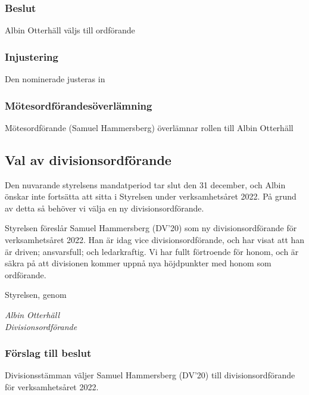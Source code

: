 \documentclass[protokoll]{dvd}
\begin{document}
        \subsubsection*{Beslut}
            \begin{attsatser}
                \item Albin Otterhäll väljs till ordförande
            \end{attsatser}

        \subsubsection*{Injustering}
        Den nominerade justeras in

        \subsubsection*{Mötesordförandesöverlämning}
        Mötesordförande (Samuel Hammersberg) överlämnar rollen till Albin Otterhäll

\newpage

\subsection{Val av divisionsordförande}

Den nuvarande styrelsens mandatperiod tar slut den 31 december, och Albin önskar inte fortsätta att sitta i Styrelsen under verksamhetsåret 2022.
På grund av detta så behöver vi välja en ny divisionsordförande.

Styrelsen föreslår Samuel Hammersberg (DV'20) som ny divisionsordförande för verksamhetsåret 2022.
Han är idag vice divisionsordförande, och har visat att han är driven; ansvarsfull; och ledarkraftig.
Vi har fullt förtroende för honom, och är säkra på att divisionen kommer uppnå nya höjdpunkter med honom som ordförande.

Styrelsen, genom

\emph{Albin Otterhäll\\Divisionsordförande}

        \subsubsection*{Förslag till beslut}
        \begin{attsatser}
            \item Divisionsstämman väljer Samuel Hammersberg (DV'20) till divisionsordförande för verksamhetsåret 2022.
        \end{attsatser}
\end{document}
